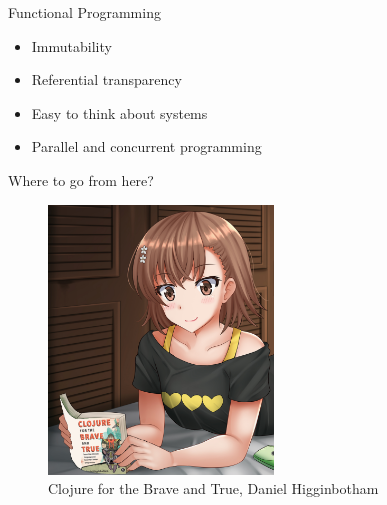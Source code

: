 \documentclass[ignorenonframetext,]{beamer}
\providecommand{\tightlist}{%
  \setlength{\itemsep}{0pt}\setlength{\parskip}{0pt}}
\begin{document}
\begin{frame}{Functional Programming}
\protect\hypertarget{functional-programming}{}

\begin{itemize}
\tightlist
\item
  Immutability
\item
  Referential transparency
\item
  Easy to think about systems
\item
  Parallel and concurrent programming
\end{itemize}

\end{frame}

\begin{frame}{Where to go from here?}
\protect\hypertarget{where-to-go-from-here}{}

\begin{figure}
\centering
\includegraphics[width=\textwidth,height=2.8125in]{Misaka_Mikoto_Clojure_For_The_Brave_And_True.png}
\caption{Clojure for the Brave and True, Daniel Higginbotham}
\end{figure}

\end{frame}
\end{document}

